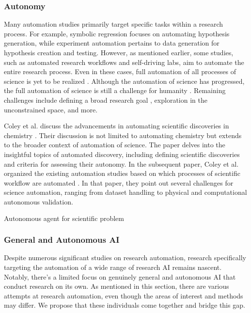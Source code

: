 
\subsubsection{Autonomy}
Many automation studies primarily target specific tasks within a research process. For example, symbolic regression focuses on automating hypothesis generation, while experiment automation pertains to data generation for hypothesis creation and testing. However, as mentioned earlier, some studies, such as automated research workflows and self-driving labs, aim to automate the entire research process. Even in these cases, full automation of all processes of science is yet to be realized \cite{zenil2023}. Although the automation of science has progressed, the full automation of science is still a challenge for humanity \cite{coley2020autonomous}. Remaining challenges include defining a broad research goal \cite{zenil2023,coley2020autonomous}, exploration \cite{coley2020autonomous} in the unconstrained space, and more.

Coley et al. discuss the advancements in automating scientific discoveries in chemistry \cite{coley2020autonomous}. Their discussion is not limited to automating chemistry but extends to the broader context of automation of science. The paper delves into the insightful topics of automated discovery, including defining scientific discoveries and criteria for assessing their autonomy. In the subsequent paper, Coley et al. organized the existing automation studies based on which processes of scientific workflow are automated \cite{coley2020autonomousII}. In that paper, they point out several challenges for science automation, ranging from dataset handling to physical and computational autonomous validation. 

Autonomous agent for scientific problem \cite{wang2023survey}


\subsubsection{General and Autonomous AI}
Despite numerous significant studies on research automation, research specifically targeting the automation of a wide range of research AI remains nascent. Notably, there's a limited focus on genuinely general and autonomous AI that conduct research on its own. As mentioned in this section, there are various attempts at research automation, even though the areas of interest and methods may differ. We propose that these individuals come together and bridge this gap.


